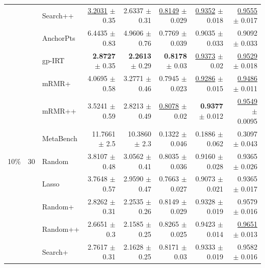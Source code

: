 \begin{longtable}{llp{}rrrrr}
 &  & Search++ & \underline{3.2031} {\scriptsize $\pm$ 0.35} & 2.6337 {\scriptsize $\pm$ 0.31} & \underline{0.8149} {\scriptsize $\pm$ 0.029} & \underline{0.9352} {\scriptsize $\pm$ 0.018} & \underline{0.9555} {\scriptsize $\pm$ 0.017} \\
 &  & AnchorPts & 6.4435 {\scriptsize $\pm$ 0.83} & 4.9606 {\scriptsize $\pm$ 0.76} & 0.7769 {\scriptsize $\pm$ 0.039} & 0.9035 {\scriptsize $\pm$ 0.033} & 0.9092 {\scriptsize $\pm$ 0.033} \\
 &  & gp-IRT & \textbf{2.8727} {\scriptsize $\pm$ 0.35} & \textbf{2.2613} {\scriptsize $\pm$ 0.29} & \textbf{0.8178} {\scriptsize $\pm$ 0.03} & \underline{0.9373} {\scriptsize $\pm$ 0.02} & \underline{0.9529} {\scriptsize $\pm$ 0.018} \\
 &  & mRMR+ & 4.0695 {\scriptsize $\pm$ 0.58} & 3.2771 {\scriptsize $\pm$ 0.46} & 0.7945 {\scriptsize $\pm$ 0.023} & \underline{0.9286} {\scriptsize $\pm$ 0.015} & \underline{0.9486} {\scriptsize $\pm$ 0.011} \\
 &  & mRMR++ & 3.5241 {\scriptsize $\pm$ 0.59} & 2.8213 {\scriptsize $\pm$ 0.49} & \underline{0.8078} {\scriptsize $\pm$ 0.02} & \textbf{0.9377} {\scriptsize $\pm$ 0.012} & \underline{0.9549} {\scriptsize $\pm$ 0.0095} \\
 &  & MetaBench & 11.7661 {\scriptsize $\pm$ 2.5} & 10.3860 {\scriptsize $\pm$ 2.3} & 0.1322 {\scriptsize $\pm$ 0.046} & 0.1886 {\scriptsize $\pm$ 0.062} & 0.3097 {\scriptsize $\pm$ 0.043} \\
\midrule
10\% & 30 & Random & 3.8107 {\scriptsize $\pm$ 0.48} & 3.0562 {\scriptsize $\pm$ 0.41} & 0.8035 {\scriptsize $\pm$ 0.036} & 0.9160 {\scriptsize $\pm$ 0.028} & 0.9365 {\scriptsize $\pm$ 0.026} \\
 &  & Lasso & 3.7648 {\scriptsize $\pm$ 0.57} & 2.9590 {\scriptsize $\pm$ 0.47} & 0.7663 {\scriptsize $\pm$ 0.027} & 0.9073 {\scriptsize $\pm$ 0.021} & 0.9365 {\scriptsize $\pm$ 0.017} \\
 &  & Random+ & 2.8262 {\scriptsize $\pm$ 0.31} & 2.2535 {\scriptsize $\pm$ 0.26} & 0.8149 {\scriptsize $\pm$ 0.029} & 0.9328 {\scriptsize $\pm$ 0.019} & 0.9579 {\scriptsize $\pm$ 0.016} \\
 &  & Random++ & 2.6651 {\scriptsize $\pm$ 0.3} & 2.1585 {\scriptsize $\pm$ 0.25} & 0.8265 {\scriptsize $\pm$ 0.025} & 0.9423 {\scriptsize $\pm$ 0.014} & \underline{0.9651} {\scriptsize $\pm$ 0.013} \\
 &  & Search+ & 2.7617 {\scriptsize $\pm$ 0.31} & 2.1628 {\scriptsize $\pm$ 0.25} & 0.8171 {\scriptsize $\pm$ 0.03} & 0.9333 {\scriptsize $\pm$ 0.019} & 0.9582 {\scriptsize $\pm$ 0.016} \\

\end{longtable}
